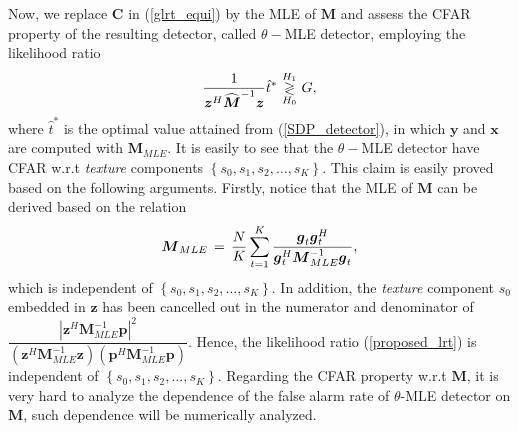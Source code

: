 Now, we replace $\boldsymbol{C}$ in (\ref{glrt_equi}) by the MLE of $\boldsymbol{M}$
and assess the CFAR property of the resulting detector,
 called $\theta-$MLE detector, employing the likelihood ratio
\begin{equation}\label{proposed_lrt}
  \frac{1}
     {  \boldsymbol{z}^H \widehat{\boldsymbol{M}}^{-1} \boldsymbol{z} } \hat{t}^{\ast}
   \thinspace\mathop{\gtrless}_{H_0}^{H_1}\thinspace G,
\end{equation}
where
$\hat{t}^\ast$ is the optimal value attained from (\ref{SDP_detector}), in which
$\boldsymbol{y}$ and $\boldsymbol{x}$ are computed with
$\boldsymbol{M}_{MLE}$.
It is easily to see that the
$\theta-$MLE
detector have CFAR w.r.t \textit{texture} components
$\left\{s_0,s_1,s_2,\ldots,s_K\right\}$. This claim is easily proved based on the
following arguments.
Firstly, notice that
the MLE of $\boldsymbol{M}$ can be derived based on the relation %
\begin{equation}\label{equi_mle}
  \boldsymbol{M}_{MLE} \thinspace = \thinspace
  \frac{N}{K} \sum_{t=1}^{K} \frac{ \boldsymbol{g}_t \boldsymbol{g}_t^H}
                                  {\boldsymbol{g}_t^H \boldsymbol{M}_{MLE}^{-1}\boldsymbol{g}_t},
\end{equation}
 which
 is independent of $\left \{s_0,s_1,s_2,\ldots,s_K \right \}$.
 In addition, the \textit{texture} component $s_0$ embedded in $\boldsymbol{z}$
 has been cancelled out in the numerator and denominator of
   $
 \dfrac{\left | \boldsymbol{z}^H  \boldsymbol{M}_{MLE} ^{-1}\boldsymbol{p} \right |^2}
     { \left (\boldsymbol{z}^H \boldsymbol{M}_{MLE}^{-1} \boldsymbol{z} \right )
   \left (\boldsymbol{p}^H \boldsymbol{M}_{MLE}^{-1} \boldsymbol{p} \right )}
 $.
 Hence,
  the likelihood ratio (\ref{proposed_lrt}) is independent of $\left \{s_0,s_1,s_2,\ldots,s_K\right \}$.
 Regarding the CFAR property w.r.t $\boldsymbol{M}$,
 it is very hard to analyze
 the dependence of  the false alarm rate of $\theta$-MLE detector on $\boldsymbol{M}$,
 such dependence will be numerically analyzed. 